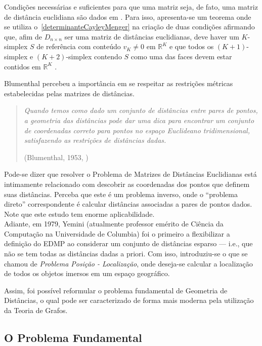 Condições necessárias e suficientes para que uma matriz seja, de fato, uma matriz de distância euclidiana são dados em \cite{EDMPResolucao}. Para isso, apresenta-se um teorema onde se utiliza o~\ref{determinanteCayleyMenger} na criação de duas condições afirmando que, afim de $D_{n\times n}$ ser uma matriz de distâncias euclidianas, deve haver um $K$-simplex $S$ de referência com conteúdo $v_K \neq 0$ em $\mathbb{R}^K$ e que todos os $(K+1)$-simplex e $(K+2)$-simplex contendo $S$ como uma das faces devem estar contidos em $\mathbb{R}^K$ \cite{carlileGDandAplications}.

Blumenthal percebeu a importância em se respeitar as restrições métricas estabelecidas pelas matrizes de distâncias.
\begin{quotation}
	\textit{Quando temos como dado um conjunto de distâncias entre pares de pontos, a geometria das distâncias pode dar uma dica para encontrar um conjunto de coordenadas correto para pontos no espaço Euclideano tridimensional, satisfazendo as restrições de distâncias dadas.}
	\begin{flushright}
		(Blumenthal, 1953, \cite{Blumenthal:53})
	\end{flushright}
\end{quotation}

Pode-se dizer que resolver o Problema de Matrizes de Distâncias Euclidianas está intimamente relacionado com descobrir as coordenadas dos pontos que definem suas distâncias. Perceba que este é um problema inverso, onde o ``problema direto'' correspondente é calcular distâncias associadas a pares de pontos dados. Note que este estudo tem enorme aplicabilidade.
\\

Adiante, em 1979, Yemini (atualmente professor emérito de Ciência da Computação na Universidade de Columbia) foi o primeiro a flexibilizar a definição do EDMP ao considerar um conjunto de distâncias esparso \cite{Yemini:79} --- i.e., que não se tem todas as distâncias dadas a priori. Com isso, introduziu-se o que se chamou de \textit{Problema Posição - Localização}, onde deseja-se calcular a localização de todos os objetos imersos em um espaço geográfico. 

Assim, foi possível reformular o problema fundamental de Geometria de Distâncias, o qual pode ser caracterizado de forma mais moderna pela utilização da Teoria de Grafos.

\subsection{O Problema Fundamental}

